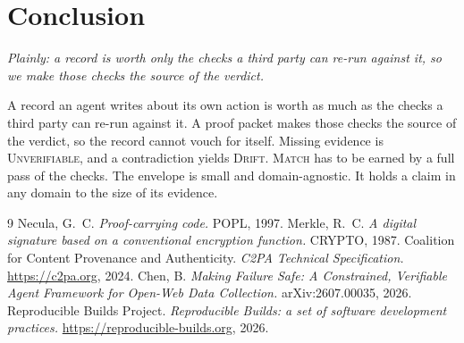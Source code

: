 \documentclass[11pt]{article}
\begin{document}
\section{Conclusion}
\emph{Plainly: a record is worth only the checks a third party can re-run against it, so we make those checks the source of the verdict.}

A record an agent writes about its own action is worth as much as the checks a third party can re-run against it. A proof packet makes those checks the source of the verdict, so the record cannot vouch for itself. Missing evidence is \textsc{Unverifiable}, and a contradiction yields \textsc{Drift}. \textsc{Match} has to be earned by a full pass of the checks. The envelope is small and domain-agnostic. It holds a claim in any domain to the size of its evidence.

\begin{thebibliography}{9}
\small
{} Necula, G.~C. \emph{Proof-carrying code.} POPL, 1997.
 Merkle, R.~C. \emph{A digital signature based on a conventional encryption function.} CRYPTO, 1987.
 Coalition for Content Provenance and Authenticity. \emph{C2PA Technical Specification.} \url{https://c2pa.org}, 2024.
 Chen, B. \emph{Making Failure Safe: A Constrained, Verifiable Agent Framework for Open-Web Data Collection.} arXiv:2607.00035, 2026.
 Reproducible Builds Project. \emph{Reproducible Builds: a set of software development practices.} \url{https://reproducible-builds.org}, 2026.
\end{thebibliography}
\end{document}
